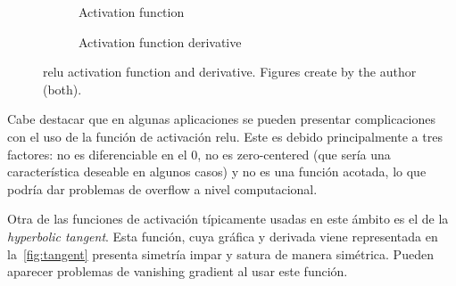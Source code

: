 \begin{figure}[ht]
  \centering
  \begin{subfigure}[b]{.375\textwidth}
    \centering
    \caption{Activation function}
  \end{subfigure}\hspace{3em}
  \begin{subfigure}[b]{.375\textwidth}
    \centering
    \caption{Activation function derivative}
  \end{subfigure}
  \caption[ and activation function]{\acf{relu} activation
    function and derivative. Figures create by the author (both).}%
  \label{fig:relu}
\end{figure}

Cabe destacar que en algunas aplicaciones se pueden presentar complicaciones
con el uso de la función de activación \gls{relu}. Este es debido
principalmente a tres factores: no es diferenciable en el \(0\), no es
zero-centered (que sería una característica deseable en algunos casos) y no
es una función acotada, lo que podría dar problemas de overflow a nivel
computacional.

Otra de las funciones de activación típicamente usadas en este ámbito es el de
la \emph{hyperbolic tangent}. Esta función, cuya
gráfica y derivada viene representada en la\ \vref{fig:tangent} presenta
simetría impar y satura de manera simétrica. Pueden aparecer problemas de
vanishing gradient al usar este función.

